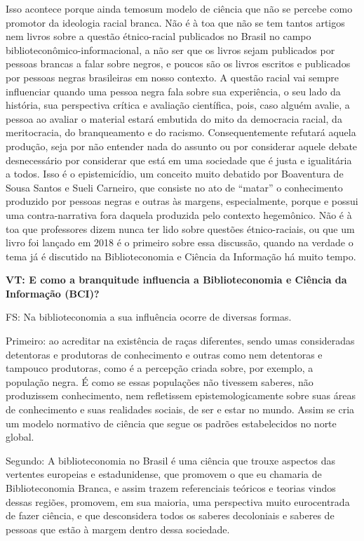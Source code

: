 \documentclass[a4paper,
fontsize=11pt,
oneside,
numbers=noperiodatend,
parskip=half-,
bibliography=totoc,
final
]{scrartcl}
\begin{document}
Isso acontece porque ainda temosum modelo de ciência que não se percebe
como promotor da ideologia racial branca. Não é à toa que não se tem
tantos artigos nem livros sobre a questão étnico-racial publicados no
Brasil no campo biblioteconômico-informacional, a não ser que os livros
sejam publicados por pessoas brancas a falar sobre negros, e poucos são
os livros escritos e publicados por pessoas negras brasileiras em nosso
contexto. A questão racial vai sempre influenciar quando uma pessoa
negra fala sobre sua experiência, o seu lado da história, sua
perspectiva crítica e avaliação científica, pois, caso alguém avalie, a
pessoa ao avaliar o material estará embutida do mito da democracia
racial, da meritocracia, do branqueamento e do racismo. Consequentemente
refutará aquela produção, seja por não entender nada do assunto ou por
considerar aquele debate desnecessário por considerar que está em uma
sociedade que é justa e igualitária a todos. Isso é o epistemicídio, um
conceito muito debatido por Boaventura de Sousa Santos e Sueli Carneiro,
que consiste no ato de \enquote{matar} o conhecimento produzido por
pessoas negras e outras às margens, especialmente, porque e possui uma
contra-narrativa fora daquela produzida pelo contexto hegemônico. Não é
à toa que professores dizem nunca ter lido sobre questões
étnico-raciais, ou que um livro foi lançado em 2018 é o primeiro sobre
essa discussão, quando na verdade o tema já é discutido na
Biblioteconomia e Ciência da Informação há muito tempo.

\textbf{VT: E como a branquitude influencia a Biblioteconomia e Ciência
da Informação (BCI)?}

FS: Na biblioteconomia a sua influência ocorre de diversas formas.

Primeiro: ao acreditar na existência de raças diferentes, sendo umas
consideradas detentoras e produtoras de conhecimento e outras como nem
detentoras e tampouco produtoras, como é a percepção criada sobre, por
exemplo, a população negra. É como se essas populações não tivessem
saberes, não produzissem conhecimento, nem refletissem
epistemologicamente sobre suas áreas de conhecimento e suas realidades
sociais, de ser e estar no mundo. Assim se cria um modelo normativo de
ciência que segue os padrões estabelecidos no norte global.

Segundo: A biblioteconomia no Brasil é uma ciência que trouxe aspectos
das vertentes europeias e estadunidense, que promovem o que eu chamaria
de Biblioteconomia Branca, e assim trazem referenciais teóricos e
teorias vindos dessas regiões, promovem, em sua maioria, uma perspectiva
muito eurocentrada de fazer ciência, e que desconsidera todos os saberes
decoloniais e saberes de pessoas que estão à margem dentro dessa
sociedade.
\end{document}
